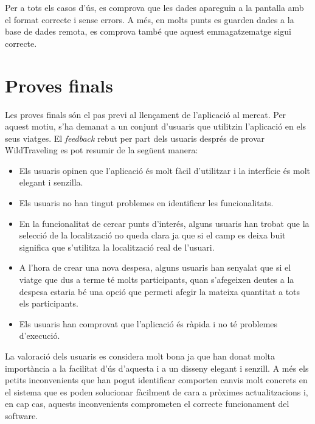 Per a tots els casos d'ús, es comprova que les dades apareguin a la pantalla amb el format correcte i sense errors. A més, en molts punts es guarden dades a la base de dades remota, es comprova també que aquest emmagatzematge sigui correcte.

\section{Proves finals}

Les proves finals són el pas previ al llençament de l'aplicació al mercat. Per aquest motiu, s'ha demanat a un conjunt d'usuaris que utilitzin l'aplicació en els seus viatges. El \textit{feedback} rebut per part dels usuaris després de provar WildTraveling es pot resumir de la següent manera:
\begin{itemize}
\item{}Els usuaris opinen que l'aplicació és molt fàcil d'utilitzar i la interfície és molt elegant i senzilla.
\item{}Els usuaris no han tingut problemes en identificar les funcionalitats.
\item{}En la funcionalitat de cercar punts d'interés, alguns usuaris han trobat que la selecció de la localització no queda clara ja que si el camp es deixa buit significa que s'utilitza la localització real de l'usuari.
\item{}A l'hora de crear una nova despesa, alguns usuaris han senyalat que si el viatge que dus a terme té molts participants, quan s'afegeixen deutes a la despesa estaria bé una opció que permeti afegir la mateixa quantitat a tots els participants.
\item{}Els usuaris han comprovat que l'aplicació és ràpida i no té problemes d'execució.
\end{itemize} 

La valoració dels usuaris es considera molt bona ja que han donat molta importància a la facilitat d'ús d'aquesta i a un disseny elegant i senzill. A més els petits inconvenients que han pogut identificar comporten canvis molt concrets en el sistema que es poden solucionar fàcilment de cara a pròximes actualitzacions i, en cap cas, aquests inconvenients comprometen el correcte funcionament del software.
